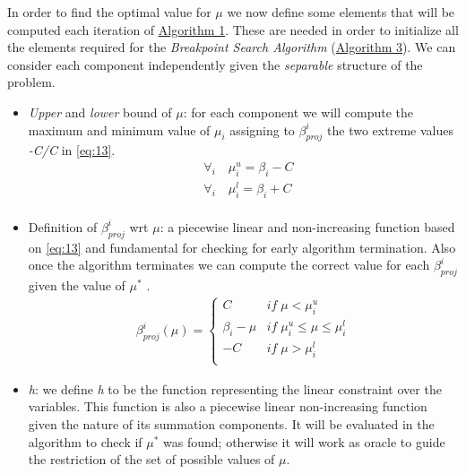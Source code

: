 \documentclass[12pt]{article}
\begin{document}
	In order to find the optimal value for $\mu$ we now define some elements that will be computed each iteration of \hyperref[algo:1]{Algorithm 1}. These are needed in order to initialize all the elements required for the \textit{Breakpoint Search Algorithm} (\hyperref[algo:3]{Algorithm 3}). We can consider each component independently given the \textit{separable} structure of the problem.
	\begin{itemize}
	\item \textit{Upper} and \textit{lower} bound of $\mu$: for each component we will compute the maximum and minimum value of $\mu_i$ assigning to $\beta_{proj}^i$ the two extreme values \textit{-C/C} in \eqref{eq:13}.
    	\begin{equation}\label{eq:14}
    	    \begin{aligned}
    	        &\forall_i \quad \mu_i^u = \beta_i - C\\
    	        &\forall_i \quad \mu_i^l = \beta_i + C\\
    	    \end{aligned}
    	\end{equation}
	\item Definition of $\beta_{proj}^i$ wrt $\mu$: a piecewise linear and non-increasing function based on \eqref{eq:13} and fundamental for checking for early algorithm termination. Also once the algorithm terminates we can compute the correct value for each $\beta_{proj}^i$ given the value of $\mu^*$ .
	    \begin{equation}\label{eq:15}
            \begin{aligned}
                \beta_{proj}^i(\mu) = 
                \begin{cases}
                    C \qquad &if\;\mu < \mu_i^u\\
                    \beta_i - \mu &if\; \mu_i^u \leq \mu \leq \mu_i^l\\
                    -C &if\;\mu > \mu_i^l\\
                \end{cases}
            \end{aligned}
        \end{equation}
	\item \textit{h}: we define \textit{h} to be the function representing the linear constraint over the variables. This function is also a piecewise linear non-increasing function given the nature of its summation components. It will be evaluated in the algorithm to check if $\mu^*$ was found; otherwise it will work as oracle to guide the restriction of the set of possible values of $\mu$.

\end{itemize}
\end{document}
